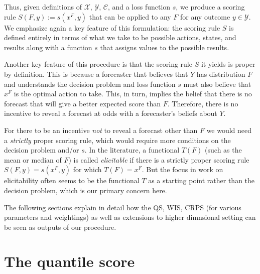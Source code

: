 \documentclass{article}
\begin{document}
Thus, given definitions of $\mathcal{X}$, $\mathcal{Y}$, $\mathcal{C}$, and a loss function $s$, we produce a scoring rule $S(F,y):= s(x^F,y)$ that can be applied to any $F$ for any outcome $y \in \mathcal{Y}$.  We emphasize again a key feature of this formulation: the scoring rule $S$ is defined entirely in terms of what we take to be possible actions, states, and results along with a function $s$ that assigns values to the possible results.

Another key feature of this procedure is that the scoring rule $S$ it yields is proper by definition.  This is because a forecaster that believes that $Y$ has distribution $F$ and understands the decision problem and loss function $s$ must also believe that $x^F$ is the optimal action to take.  This, in turn, implies the belief that there is no forecast that will give a better expected score than $F$.  Therefore, there is no incentive to reveal a forecast at odds with a forecaster's beliefs about $Y$.  

\begin{remark} For there to be an incentive \emph{not} to reveal a forecast other than $F$ we would need a \emph{strictly} proper scoring rule, which would require more conditions on the decision problem and/or $s$. In the literature, a functional $T(F)$ (such as the mean or median of $F$) is called \emph{elicitable} if there is a strictly proper scoring rule $S(F,y) = s(x^F,y)$ for which $T(F)=x^F$.  But the focus in work on elicitability often seems to be the functional $T$ as a starting point rather than the decision problem, which is our primary concern here.
\end{remark}

The following sections explain in detail how the QS, WIS, CRPS (for various parameters and weightings) as well as extensions to higher dimnsional setting can be seen as outputs of our procedure. 

\section{The quantile score}
\end{document}
